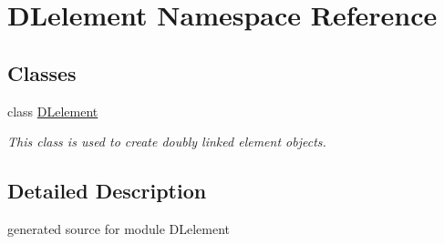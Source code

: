 \hypertarget{namespace_d_lelement}{}\section{D\+Lelement Namespace Reference}
\label{namespace_d_lelement}
\subsection*{Classes}
\begin{DoxyCompactItemize}
\item 
class \hyperlink{class_d_lelement_1_1_d_lelement}{D\+Lelement}
\begin{DoxyCompactList}\small\item\em This class is used to create doubly linked element objects. \end{DoxyCompactList}\end{DoxyCompactItemize}


\subsection{Detailed Description}
\begin{DoxyVerb}generated source for module DLelement \end{DoxyVerb}
 